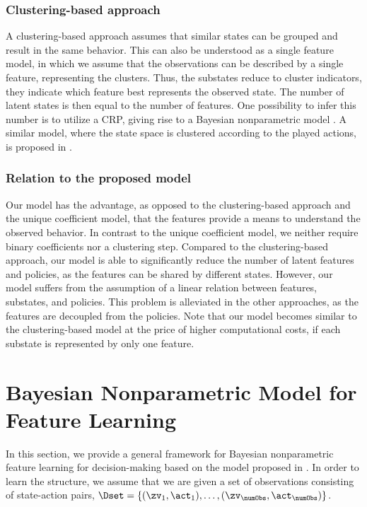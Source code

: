 \documentclass{article}
\begin{document}
\subsubsection{Clustering-based approach}
A clustering-based approach assumes that similar states can be grouped and result in the same behavior. 
This can also be understood as a single feature model, in which we assume that the observations can be described by a single feature, representing the clusters.
Thus, the substates reduce to cluster indicators, \ie they indicate which feature best represents the observed state.
The number of latent states is then equal to the number of features. 
One possibility to infer this number is to utilize a \ac{CRP}, giving rise to a Bayesian nonparametric model \cite{Michini2012}. 
A similar model, where the state space is clustered according to the played actions, is proposed in \cite{Sosic2016}. 

\subsubsection{Relation to the proposed model}
Our model has the advantage, as opposed to the clustering-based approach and the unique coefficient model, that the features provide a means to understand the observed behavior.
In contrast to the unique coefficient model, we neither require binary coefficients nor a clustering step.
Compared to the clustering-based approach, our model is able to significantly reduce the number of latent features and policies, as the features can be shared by different states.
However, our model suffers from the assumption of a linear relation between features, substates, and policies. 
This problem is alleviated in the other approaches, as the features are decoupled from the policies.
Note that our model becomes similar to the clustering-based model at the price of higher computational costs, if each substate is represented by only one feature.



\section{Bayesian Nonparametric Model for Feature Learning}
\label{sec::dm::model}
In this section, we provide a general framework for Bayesian nonparametric feature learning for decision-making based on the model proposed in . In order to learn the structure, we assume that we are given a set of observations consisting of state-action pairs, $\Dset =\{ (\zv_1, \act_1), \ldots, (\zv_\numObs, \act_\numObs) \} $. 
\end{document}
